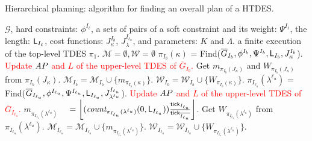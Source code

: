 \documentclass{article}
\newcommand{\tick}{{\sf tick}}
\newcommand{\AP}{{\textit AP}}
\newcommand{\Len}{{\sf L}}
\newcommand{\M}{\mathcal{M}}
\newcommand{\W}{\mathcal{W}}
\newcommand{\Iu}{I_{\ell_u}}
\newcommand{\red}[1]{\textcolor{red}{#1}}
\begin{document}
%
\begin{algorithm}
\caption{Hierarchical planning: algorithm for finding an overall plan of a HTDES.} \label{alg2}
\begin{algorithmic}
%
\Require $\mathcal{G}$, hard constraints: $\phi^{I_\ell}$, a sets of pairs of a soft constraint and its weight: $\Psi^{I_\ell}$, the length: $\Len_{I_\ell}$, cost functions: $J_\kappa^{I_b}$, $J_{\lambda}^{\Iu}$, and parameters: $K$ and $\Lambda$.
\Ensure a finite execution of the top-level TDES $\pi_1$.
%
\State $\mathcal{M}=\emptyset,\mathcal{W}=\emptyset$
		\State ${\pi_{I_b}(\kappa)}$ = Find($\overline{G}_{I_b},\phi^{I_b},\Psi^{I_b},\Len_{{I_b}},J^{I_b}_\kappa$).
		\State \red{Update $\AP$ and $L$ of the upper-level TDES of $\overline{G}_{I_b}$.}
		\Else
		\State Get $m_{\pi_{{I_b}}(J_\kappa)}$ and $W_{\pi_{{I_b}}(J_\kappa)}$ from $\pi_{{I_b}}(J_\kappa)$.
		\State $\mathcal{M}_{I_b}=\mathcal{M}_{I_b}\cup\{m_{\pi_{{I_b}}(\kappa)}\}$.
		\State $\mathcal{W}_{I_b}=\mathcal{W}_{I_b}\cup\{W_{\pi_{{I_b}}(\kappa)}\}$.
		\EndIf
	\EndFor
\EndFor
{}
\For{$\overline{G}_{\Iu}\in\{\overline{G}_{\ell_u}\}$}
		\State ${\pi_{{\Iu}}(\lambda^{\ell_u})}$ = Find($\overline{G}_{\Iu},\phi^{\Iu},\Psi^{\Iu},\Len_{\Iu},J_{\lambda^{\ell_u}}^{\Iu}$).
		\If{${\pi_{{\Iu}}(\lambda_{\ell_u})}=\bot$}
		\State \red{Update $\AP$ and $L$ of the upper-level TDES of $\overline{G}_{\Iu}$.}
		\Else
		\State $m_{\pi_{\Iu}(\lambda^{\ell_u})}$
		\State
		~~$=\left\lfloor (\textit{count}_{\pi_{\Iu}(\lambda^{\ell_u})}(0,\Len_{\Iu}))\frac{\tick_{\Iu}}{\tick_{\overline{\Iu}}} \right\rfloor $.
		\State Get $W_{\pi_{\Iu}(\lambda^{\ell_u})}$ from $\pi_{\Iu}(\lambda^{\ell_u})$.
		\State $\mathcal{M}_{\Iu}=\mathcal{M}_{\Iu}\cup\{m_{\pi_{\Iu}(\lambda^{\ell_u})}\}$. 
		\State
		$\mathcal{W}_{\Iu}=\mathcal{W}_{\Iu}\cup\{W_{\pi_{\Iu}(\lambda^{\ell_u})}\}$.
		\EndIf
\EndFor
\EndFor
\EndFor
%
\end{algorithmic}
\end{algorithm}
%
\end{document}
